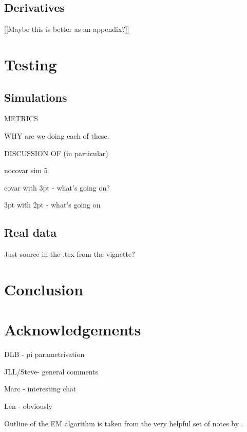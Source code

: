 \subsection{Derivatives}
[[Maybe this is better as an appendix?]]


\section{Testing}

\subsection{Simulations}

METRICS

WHY are we doing each of these.

DISCUSSION OF (in particular)

nocovar sim 5

covar with 3pt - what's going on?

3pt with 2pt - what's going on

\subsection{Real data}

Just source in the .tex from the vignette?




\section{Conclusion}


\section{Acknowledgements}
DLB - pi parametrisation

JLL/Steve- general comments

Marc - interesting chat

Len - obviously

Outline of the EM algorithm is taken from the very helpful set of notes by \cite{piater}.


